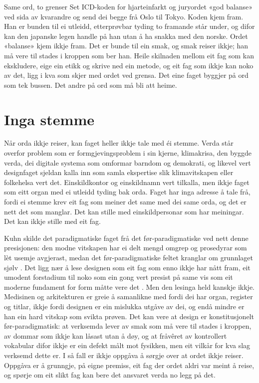 \begin{kasus}{Same ord, to grenser}
Set ICD-koden for hjarteinfarkt og juryordet «god balanse» ved sida av kvarandre og send dei begge frå Oslo til Tokyo. Koden kjem fram. Han er bunden til ei utleidd, etterprøvbar tyding to framande står under, og difor kan den japanske legen handle på han utan å ha snakka med den norske. Ordet «balanse» kjem ikkje fram. Det er bunde til ein smak, og smak reiser ikkje; han må vere til stades i kroppen som ber han. Heile skilnaden mellom eit fag som kan ekskludere, eige ein etikk og skrive ned ein metode, og eit fag som ikkje kan noko av det, ligg i kva som skjer med ordet ved grensa. Det eine faget byggjer på ord som tek bussen. Det andre på ord som må bli att heime.
\end{kasus}

\section{Inga stemme}

Når orda ikkje reiser, kan faget heller ikkje tale med éi stemme. Verda står overfor problem som er formgjevingsproblem i sin kjerne, klimakrisa, den byggde verda, dei digitale systema som omformar barndom og demokrati, og likevel vert designfaget sjeldan kalla inn som samla ekspertise slik klimavitskapen eller folkehelsa vert det. Einskildkontor og einskildnamn vert tilkalla, men ikkje faget som eitt organ med ei utleidd tyding bak orda. Faget har inga adresse å tale frå, fordi ei stemme krev eit fag som meiner det same med dei same orda, og det er nett det som manglar. Det kan stille med einskildpersonar som har meiningar. Det kan ikkje stille med eit fag.

Kuhn skilde det paradigmatiske faget frå det før-paradigmatiske ved nett denne presisjonen: den modne vitskapen har ei delt mengd omgrep og prosedyrar som lèt usemje avgjerast, medan det før-paradigmatiske feltet kranglar om grunnlaget sjølv \autocite{kuhn1962}. Det ligg nær å lese designen som eit fag som enno ikkje har nått fram, eit umodent forstadium til noko som ein gong vert presist på same vis som eit moderne fundament for form måtte vere det \autocite{fields2022}. Men den lesinga held kanskje ikkje. Medisinen og arkitekturen er greie å samanlikne med fordi dei har organ, register og titlar, ikkje fordi designen er ein mislukka utgåve av dei, og endå mindre er han ein hard vitskap som svikta prøven. Det kan vere at design er konstitusjonelt før-paradigmatisk: at verksemda lever av smak som må vere til stades i kroppen, av dommar som ikkje kan låsast utan å døy, og at fråvêret av kontrollert vokabular difor ikkje er ein defekt målt mot fysikken, men eit vilkår for kva slag verksemd dette er. I så fall er ikkje oppgåva å sørgje over at ordet ikkje reiser. Oppgåva er å grunngje, på eigne premiss, eit fag der ordet aldri var meint å reise, og spørje om eit slikt fag kan bere det ansvaret verda no legg på det.

